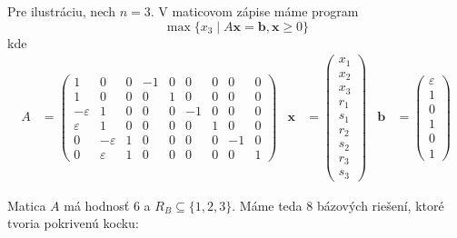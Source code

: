 \noindent
Pre ilustráciu, nech $n=3$. V maticovom zápise máme program
$$\max\{x_3\mid A\bm{x}=\bm{b}, \bm{x}\ge 0\}$$
kde
\begin{align*}
  A&=\left(\begin{array}{ccccccccc}
  1&0&0&-1&0&0&0&0&0\\
  1&0&0&0&1&0&0&0&0\\
  -\varepsilon&1&0&0&0&-1&0&0&0\\
  \varepsilon&1&0&0&0&0&1&0&0\\
  0&-\varepsilon&1&0&0&0&0&-1&0\\
0&\varepsilon&1&0&0&0&0&0&1\end{array}\right) &
\bm{x}&=\left(\begin{array}{l}x_1\\x_2\\x_3\\r_1\\s_1\\r_2\\s_2\\r_3\\s_3\end{array}\right) &
\bm{b}&=\left(\begin{array}{l}\varepsilon\\1\\0\\1\\0\\1\end{array}\right)
\end{align*}

\noindent
Matica $A$ má hodnosť $6$ a $R_B\subseteq\{1,2,3\}$. Máme teda $8$ bázových riešení, ktoré
tvoria pokrivenú kocku:

